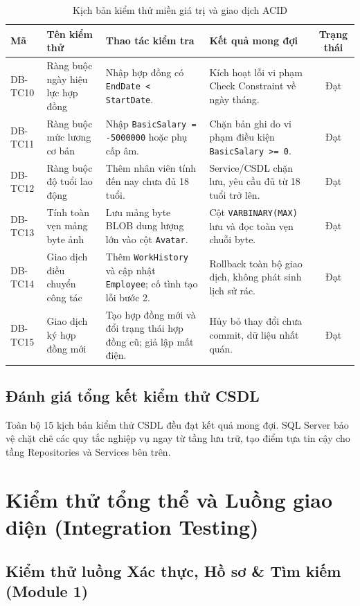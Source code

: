 \documentclass[12pt,a4paper]{report}
\begin{document}
\begin{table}[htbp]
\centering
\small
\begin{tabularx}{\textwidth}{|l|p{3.5cm}|p{3.8cm}|p{3.8cm}|c|}
\hline
\textbf{Mã} & \textbf{Tên kiểm thử} & \textbf{Thao tác kiểm tra} & \textbf{Kết quả mong đợi} & \textbf{Trạng thái} \\ \hline
DB-TC10 & Ràng buộc ngày hiệu lực hợp đồng & Nhập hợp đồng có \texttt{EndDate < StartDate}. & Kích hoạt lỗi vi phạm Check Constraint về ngày tháng. & Đạt \\ \hline
DB-TC11 & Ràng buộc mức lương cơ bản & Nhập \texttt{BasicSalary = -5000000} hoặc phụ cấp âm. & Chặn bản ghi do vi phạm điều kiện \texttt{BasicSalary >= 0}. & Đạt \\ \hline
DB-TC12 & Ràng buộc độ tuổi lao động & Thêm nhân viên tính đến nay chưa đủ 18 tuổi. & Service/CSDL chặn lưu, yêu cầu đủ từ 18 tuổi trở lên. & Đạt \\ \hline
DB-TC13 & Tính toàn vẹn mảng byte ảnh & Lưu mảng byte BLOB dung lượng lớn vào cột \texttt{Avatar}. & Cột \texttt{VARBINARY(MAX)} lưu và đọc toàn vẹn chuỗi byte. & Đạt \\ \hline
DB-TC14 & Giao dịch điều chuyển công tác & Thêm \texttt{WorkHistory} và cập nhật \texttt{Employee}; cố tình tạo lỗi bước 2. & Rollback toàn bộ giao dịch, không phát sinh lịch sử rác. & Đạt \\ \hline
DB-TC15 & Giao dịch ký hợp đồng mới & Tạo hợp đồng mới và đổi trạng thái hợp đồng cũ; giả lập mất điện. & Hủy bỏ thay đổi chưa commit, dữ liệu nhất quán. & Đạt \\ \hline
\end{tabularx}
\caption{Kịch bản kiểm thử miền giá trị và giao dịch ACID}
\end{table}

\subsection*{Đánh giá tổng kết kiểm thử CSDL}
Toàn bộ 15 kịch bản kiểm thử CSDL đều đạt kết quả mong đợi. SQL Server bảo vệ chặt chẽ các quy tắc nghiệp vụ ngay từ tầng lưu trữ, tạo điểm tựa tin cậy cho tầng Repositories và Services bên trên.

\section{Kiểm thử tổng thể và Luồng giao diện (Integration Testing)}

\subsection{Kiểm thử luồng Xác thực, Hồ sơ \& Tìm kiếm (Module 1)}
\end{document}
